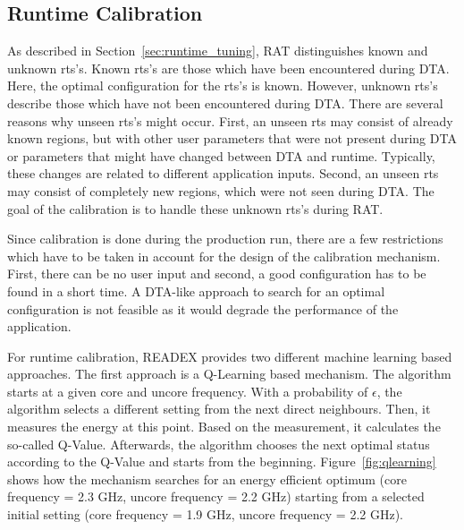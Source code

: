 \subsection{Runtime Calibration} \label{sec:calibration}

As described in Section~\ref{sec:runtime_tuning}, RAT distinguishes known and unknown rts's. 
Known rts's are those which have been encountered during DTA. Here, the optimal configuration for the rts's is known. However, unknown rts's describe those which have not been encountered during DTA. There are several reasons why unseen rts's might occur. First, an unseen rts may consist of already known regions, but with other user parameters that were not present during DTA or parameters that might have changed between DTA and runtime. Typically, these changes are related to different application inputs. Second, an unseen rts may consist of completely new regions, which were not seen during DTA. The goal of the calibration is to handle these unknown rts's during RAT.

Since calibration is done during the production run, there are a few restrictions which have to be taken in account for the design of the calibration mechanism. First, there can be no user input and second, a good configuration has to be found in a short time. A DTA-like approach to search for an optimal configuration is not feasible as it would degrade the performance of the application.

For runtime calibration, READEX provides two different machine learning based approaches. The first approach is a Q-Learning based mechanism. The algorithm starts at a given core and uncore frequency. With a probability of {$\epsilon$}, the algorithm selects a different setting from the next direct neighbours. Then, it measures the energy at this point. Based on the measurement, it calculates the so-called Q-Value. Afterwards, the algorithm chooses the next optimal status according to the Q-Value and starts from the beginning. Figure~\ref{fig:qlearning} shows how the mechanism searches for an energy efficient optimum (core frequency = 2.3 GHz, uncore frequency = 2.2 GHz) starting from a selected initial setting (core frequency = 1.9 GHz, uncore frequency = 2.2 GHz).


